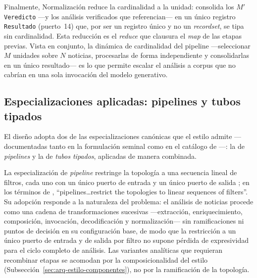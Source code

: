 \documentclass[12pt]{report}
\begin{document}
Finalmente, Normalización reduce la cardinalidad a la unidad: consolida los \(M'\) \texttt{Veredicto} ---y los análisis verificados que referencian--- en un único registro \texttt{Resultado} (puerto~14) que, por ser un registro único y no un \textit{recordset}, se tipa sin cardinalidad. Esta reducción es el \textit{reduce} que clausura el \textit{map} de las etapas previas. Vista en conjunto, la dinámica de cardinalidad del pipeline ---seleccionar \(M\) unidades sobre \(N\) noticias, procesarlas de forma independiente y consolidarlas en un único resultado--- es lo que permite escalar el análisis a corpus que no cabrían en una sola invocación del modelo generativo.

\subsection{Especializaciones aplicadas: pipelines y tubos tipados}
\label{sec:arq-car-especializaciones}

El diseño adopta dos de las especializaciones canónicas que el estilo admite ---documentadas tanto en la formulación seminal \citep{garlanshaw:1994} como en el catálogo de \citet[\S3.12]{cristia:2025}---: la de \textit{pipelines} y la de \textit{tubos tipados}, aplicadas de manera combinada.

La especialización de \textit{pipeline} restringe la topología a una secuencia lineal de filtros, cada uno con un único puerto de entrada y un único puerto de salida \citep[\S3.12.1]{cristia:2025}; en los términos de \citet{garlanshaw:1994}, ``pipelines\ldots restrict the topologies to linear sequences of filters''. Su adopción responde a la naturaleza del problema: el análisis de noticias procede como una cadena de transformaciones sucesivas ---extracción, enriquecimiento, composición, invocación, decodificación y normalización--- sin ramificaciones ni puntos de decisión en su configuración base, de modo que la restricción a un único puerto de entrada y de salida por filtro no supone pérdida de expresividad para el ciclo completo de análisis. Las variantes analíticas que requieran recombinar etapas se acomodan por la composicionalidad del estilo (Subsección~\ref{sec:arq-estilo-componentes}), no por la ramificación de la topología.
\end{document}
